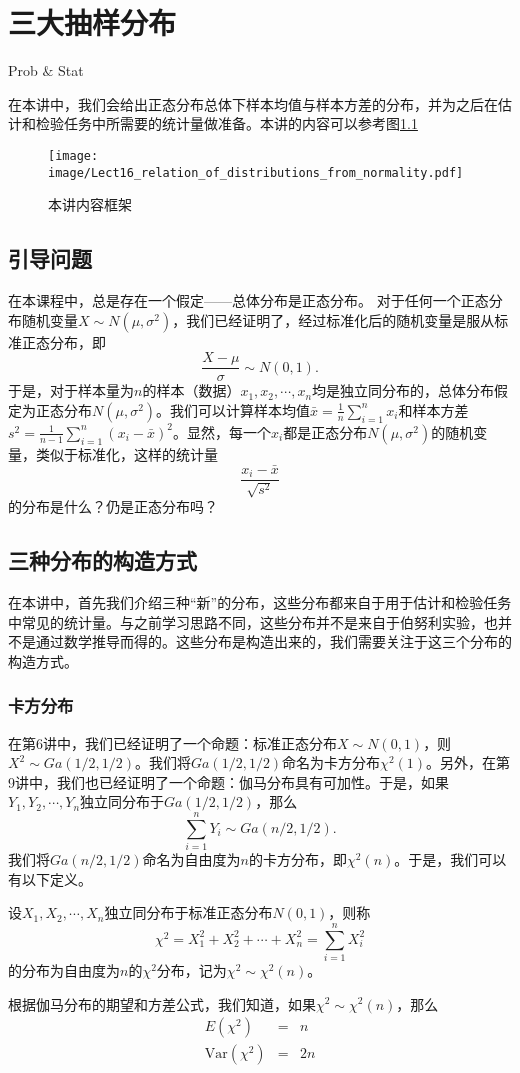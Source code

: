 \chapter{三大抽样分布}
\begin{introduction}
	\item Prob $\&$ Stat
\end{introduction}
在本讲中，我们会给出正态分布总体下样本均值与样本方差的分布，并为之后在估计和检验任务中所需要的统计量做准备。本讲的内容可以参考图\ref{fig:lect16_framework}
\begin{figure}[ht]
\centering
\texttt{[image: image/Lect16\_relation\_of\_distributions\_from\_normality.pdf]}
\caption{本讲内容框架}\label{fig:lect16_framework}
\end{figure}
\section{引导问题}
在本课程中，总是存在一个假定——总体分布是正态分布。
对于任何一个正态分布随机变量$X\sim N(\mu,\sigma^2)$，我们已经证明了，经过标准化后的随机变量是服从标准正态分布，即
$$
\frac{X-\mu}{\sigma} \sim N(0,1).
$$
于是，对于样本量为$n$的样本（数据）$x_1,x_2,\cdots,x_n $均是独立同分布的，总体分布假定为正态分布$N(\mu,\sigma^2)$。我们可以计算样本均值$\bar{x} = \frac{1}{n} \sum_{i=1}^n x_i$和样本方差$s^2 = \frac{1}{n-1}\sum_{i=1}^n  (x_i - \bar{x})^2$。显然，每一个$x_i$都是正态分布$N(\mu,\sigma^2)$的随机变量，类似于标准化，这样的统计量
$$
\frac{x_i - \bar{x}}{\sqrt{s^2}}
$$
的分布是什么？仍是正态分布吗？


\section{三种分布的构造方式}
在本讲中，首先我们介绍三种“新”的分布，这些分布都来自于用于估计和检验任务中常见的统计量。与之前学习思路不同，这些分布并不是来自于伯努利实验，也并不是通过数学推导而得的。这些分布是构造出来的，我们需要关注于这三个分布的构造方式。

\subsection{卡方分布}
在第6讲中，我们已经证明了一个命题：标准正态分布$X\sim N(0,1)$，则$X^2 \sim Ga(1/2,1/2)$。我们将$Ga(1/2,1/2)$命名为卡方分布$\chi^2(1)$。另外，在第9讲中，我们也已经证明了一个命题：伽马分布具有可加性。于是，如果$Y_1,Y_2,\cdots,Y_n$独立同分布于$Ga(1/2,1/2)$，那么$$
\sum_{i=1}^n Y_i \sim Ga(n/2,1/2).
$$
我们将$Ga(n/2,1/2)$命名为自由度为$n$的卡方分布，即$\chi^2(n)$。于是，我们可以有以下定义。
\begin{definition}
    设$X_1,X_2,\cdots,X_n$独立同分布于标准正态分布$N(0,1)$，则称
    $$
    \chi^2 = X_1^2 + X_2^2 + \cdots + X_n^2 = \sum_{i=1}^n X_i^2
    $$
    的分布为自由度为$n$的$\chi^2$分布，记为$\chi^2 \sim \chi^2(n)$。
\end{definition}
根据伽马分布的期望和方差公式，我们知道，如果$\chi^2 \sim \chi^2(n)$，那么
\begin{eqnarray*}
    E(\chi^2) &=& n\\
    \text{Var}(\chi^2) &=& 2n
\end{eqnarray*}

